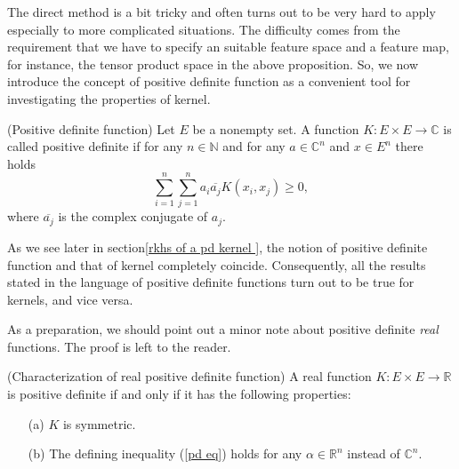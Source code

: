 \documentclass[a4paper,12pt]{article}
\begin{document}
The direct method is a bit tricky and often turns out to be very hard to apply especially to more complicated situations. The difficulty comes from the requirement that we have to specify an suitable feature space and a feature map, for instance, the tensor product space in the above proposition. So, we now introduce the concept of positive definite function as a convenient tool for investigating the properties of kernel.
\begin{dfn} (Positive definite function)
	Let \( E \) be a nonempty set.
	A function \( K: E \times E \to \mathbb{C} \) is called positive definite if for any \( n \in \mathbb{N} \) and for any \( a \in \mathbb{C}^n \) and \( x \in E^n \) there holds
	\begin{equation}
		\sum_{i=1}^{n} \sum_{j=1}^{n} a_i \overline{a_j}K(x_i,x_j) \ge 0, \label{pd eq}
	\end{equation}
	where \( \overline{a_j} \) is the complex conjugate of \( a_j \).
\end{dfn}

\begin{rem}
	As we see later in section\ref{rkhs of a pd kernel }, the notion of positive definite function and that of kernel completely coincide. Consequently, all the results stated in the language of positive definite functions turn out to be true for kernels, and vice versa.
	\fin\end{rem}

As a preparation, we should point out a minor note about positive definite \textit{real} functions. The proof is left to the reader.
\begin{prp} (Characterization of real positive definite function)\label{chara real pd}
	A real function \( K:E \times E \to \mathbb{R} \) is positive definite if and only if it has the following properties:
	\begin{itemize}
		\item[(a)] \( K \) is symmetric.
		\item[(b)] The defining inequality (\ref{pd eq}) holds for any \( \alpha \in \mathbb{R}^n \) instead of \( \mathbb{C}^n \).
	\end{itemize}
\end{prp}
\end{document}
